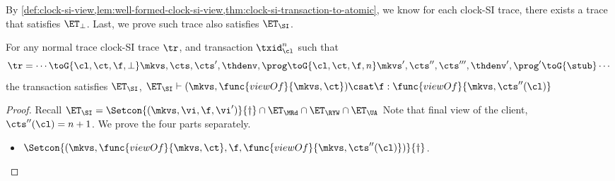 By \cref{def:clock-si-view,lem:well-formed-clock-si-view,thm:clock-si-transaction-to-atomic},
we know for each clock-SI trace, there exists a trace that satisfies \( \ET_\perp \).
Last, we prove such trace also satisfies \( \ET_\SI \).
\begin{theorem}
    For any normal trace clock-SI trace \( \tr \), and transaction \( \txid_\cl^{n} \) such that
    \[
        \tr = \cdots \toG{\cl, \ct, \f, \perp} \mkvs, \cts, \cts', \thdenv, \prog  \toG{\cl, \ct, \f, n} \mkvs', \cts'', \cts''', \thdenv', \prog' \toG{\stub} \cdots
    \]
    the transaction satisfies \( \ET_\SI \), \ie \( \ET_\SI \vdash (\mkvs, \func{viewOf}{\mkvs,\ct}) \csat \f : \func{viewOf}{\mkvs,\cts''(\cl)} \)
\end{theorem}
\begin{proof}
    Recall \( \ET_\SI  = \Setcon{(\mkvs, \vi, \f, \vi')}{\dagger} \cap \ET_\MRd \cap \ET_\RYW  \cap \ET_\UA \)
    Note that final view of the client, \( \cts''(\cl) = n + 1 \).
    We prove the four parts separately.
    \begin{itemize}
        \item \( \Setcon{(\mkvs, \func{viewOf}{\mkvs,\ct}, \f, \func{viewOf}{\mkvs,\cts''(\cl)})}{\dagger} \).

\end{itemize}
\end{proof}
